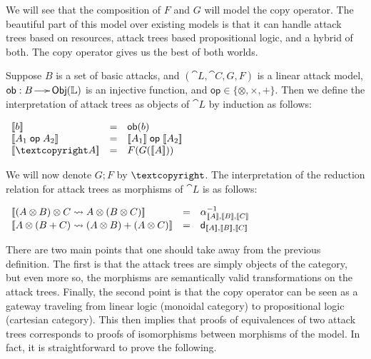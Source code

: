 \begin{full}
We will see that the composition of $F$ and $G$ will model the copy
operator.  The beautiful part of this model over existing models is
that it can handle attack trees based on resources, attack trees based
propositional logic, and a hybrid of both.  The copy operator gives us
the best of both worlds.
\begin{definition}
  \label{def:attack-tree-interpretation}
  Suppose $B$ is a set of basic attacks, and $(\cat{L}, \cat{C}, G,
  F)$ is a linear attack model, $\mathsf{ob} : B \to \mathsf{Obj}(\mathbb{L})$ is an
  injective function, and $\mathsf{op} \in \{\otimes,\times,+\}$.
  Then we define the interpretation of attack trees as objects of
  $\cat{L}$ by induction as follows:
  \begin{center}
    \begin{math}
      \begin{array}{lll}
        \interp{b} & = & \mathsf{ob}(b)\\
        \interp{A_1 \mathrel{\mathsf{op}} A_2} & = & \interp{A_1} \mathrel{\mathsf{op}} \interp{A_2}\\
        \interp{\cpy A} & = & F(G(\interp{A}))\\
      \end{array}
    \end{math}
  \end{center}
  We will now denote $G;F$ by $\cpy$.  The interpretation of the
  reduction relation for attack trees as morphisms of $\cat{L}$ is as
  follows:
  \begin{center}
    \begin{math}
      \begin{array}{lll}
        \interp{(A \otimes B) \otimes C \redto A \otimes (B \otimes C)} & = & \alpha^{-1}_{\interp{A},\interp{B},\interp{C}}\\
        \interp{A \otimes (B + C) \redto (A \otimes B) + (A \otimes C)} & = & \mathsf{d}_{\interp{A},\interp{B},\interp{C}}\\
      \end{array}
    \end{math}
  \end{center}
\end{definition}
There are two main points that one should take away from the previous
definition.  The first is that the attack trees are simply objects of
the category, but even more so, the morphisms are semantically valid
transformations on the attack trees.  Finally, the second point is
that the copy operator can be seen as a gateway traveling from linear
logic (monoidal category) to propositional logic (cartesian category).
This then implies that proofs of equivalences of two attack trees
corresponds to proofs of isomorphisms between morphisms of the model.
In fact, it is straightforward to prove the following.


\end{full}
